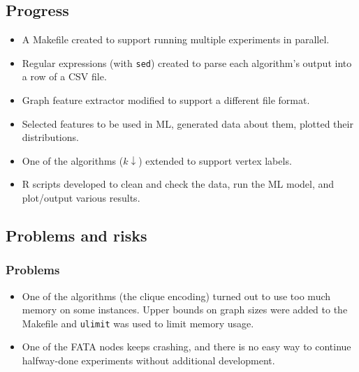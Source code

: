 \documentclass[11pt]{article}
\begin{document}
\subsection{Progress}\label{progress}


\begin{itemize}
\item A Makefile created to support running multiple experiments in parallel.
\item Regular expressions (with \texttt{sed}) created to parse each algorithm's
  output into a row of a CSV file.
\item Graph feature extractor modified to support a different file format.
\item Selected features to be used in ML, generated data about them, plotted
  their distributions.
\item One of the algorithms ($k\downarrow$) extended to support vertex labels.
\item R scripts developed to clean and check the data, run the ML model, and
  plot/output various results.
\end{itemize}

\subsection{Problems and risks}\label{problems-and-risks}

\subsubsection{Problems}\label{problems}


\begin{itemize}
\item One of the algorithms (the clique encoding) turned out to use too much
  memory on some instances. Upper bounds on graph sizes were added to the
  Makefile and \texttt{ulimit} was used to limit memory usage.
\item One of the FATA nodes keeps crashing, and there is no easy way to continue
  halfway-done experiments without additional development.
\end{itemize}
\end{document}
